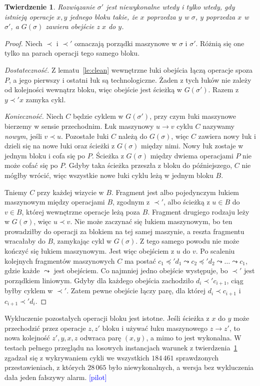 \documentclass[10pt,twocolumn]{article}
\newtheorem{theorem}{Twierdzenie}
\newcommand{\pilot}{\textcolor{blue}{[pilot]}}
\begin{document}
\begin{theorem}\label{th:main}
Rozwiązanie $\sigma'$ jest niewykonalne wtedy i tylko wtedy, gdy istnieją
operacje $x,y$ jednego bloku takie, że $x$ poprzedza $y$ w $\sigma$, $y$
poprzedza $x$ w $\sigma'$, a $G(\sigma)$ zawiera obejście z $x$ do $y$.
\end{theorem}
\begin{proof}
Niech $\prec$ i $\prec'$ oznaczają porządki maszynowe w $\sigma$
i $\sigma'$. Różnią się one tylko na parach operacji tego samego bloku.

\emph{Dostateczność.} Z lematu~\ref{le:clean} wewnętrzne łuki obejścia
łączą operacje spoza $P$, a jego pierwszy i ostatni łuk są
technologiczne. Żaden z tych łuków nie zależy od kolejności wewnątrz
bloku, więc obejście jest ścieżką w $G(\sigma')$. Razem z $y\prec' x$
zamyka cykl.

\emph{Konieczność.} Niech $C$ będzie cyklem w $G(\sigma')$, przy czym
łuki maszynowe bierzemy w sensie przechodnim. Łuk maszynowy $u\to v$
cyklu $C$ nazywamy \emph{nowym}, jeśli $v\prec u$. Pozostałe łuki $C$
należą do $G(\sigma)$, więc $C$ zawiera nowy łuk i dzieli się na nowe
łuki oraz ścieżki z $G(\sigma)$ między nimi. Nowy łuk zostaje w jednym
bloku i cofa się po $P$. Ścieżka z $G(\sigma)$ między dwiema operacjami
$P$ nie może cofać się po $P$. Gdyby taka ścieżka przeszła z bloku do
późniejszego, $C$ nie mógłby wrócić, więc wszystkie nowe łuki cyklu leżą
w jednym bloku $B$.

Tniemy $C$ przy każdej wizycie w $B$. Fragment jest albo pojedynczym
łukiem maszynowym między operacjami $B$, zgodnym z $\prec'$, albo ścieżką
z $u\in B$ do $v\in B$, której wewnętrzne operacje leżą poza $B$.
Fragment drugiego rodzaju leży w $G(\sigma)$, więc $u\prec v$. Nie może
zaczynać się łukiem maszynowym, bo ten prowadziłby do operacji za blokiem
na tej samej maszynie, a reszta fragmentu wracałaby do $B$, zamykając
cykl w $G(\sigma)$. Z tego samego powodu nie może kończyć się łukiem
maszynowym. Jest więc obejściem z $u$ do $v$. Po scaleniu kolejnych
fragmentów maszynowych $C$ ma postać
$c_1\preceq' d_1\leadsto c_2\preceq' d_2\leadsto\dots\leadsto c_1$, gdzie
każde $\leadsto$ jest obejściem. Co najmniej jedno obejście występuje, bo
$\prec'$ jest porządkiem liniowym. Gdyby dla każdego obejścia zachodziło
$d_i\prec' c_{i+1}$, ciąg byłby cyklem w $\prec'$. Zatem pewne obejście
łączy parę, dla której $d_i\prec c_{i+1}$ i $c_{i+1}\prec' d_i$.
\end{proof}

Wykluczenie pozostałych operacji bloku jest istotne. Jeśli ścieżka z $x$
do $y$ może przechodzić przez operacje $z,z'$ bloku i używać łuku
maszynowego $z\to z'$, to nowa kolejność $z',y,x,z$ odwraca parę $(x,y)$,
a mimo to jest wykonalna. W testach pełnego przeglądu na losowych
instancjach warunek z twierdzenia~\ref{th:main} zgadzał się z wykrywaniem
cykli we wszystkich $184\,461$ sprawdzonych przestawieniach, z których
$28\,065$ było niewykonalnych, a wersja bez wykluczenia dała jeden
fałszywy alarm. \pilot
\end{document}
